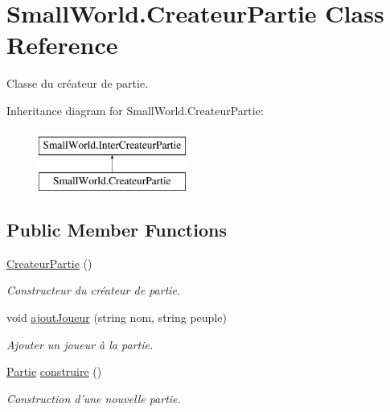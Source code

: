 \hypertarget{class_small_world_1_1_createur_partie}{\section{Small\-World.\-Createur\-Partie Class Reference}
\label{class_small_world_1_1_createur_partie}
}


Classe du créateur de partie.  


Inheritance diagram for Small\-World.\-Createur\-Partie\-:\begin{figure}[H]
\begin{center}
\leavevmode
\includegraphics[height=2.000000cm]{class_small_world_1_1_createur_partie}
\end{center}
\end{figure}
\subsection*{Public Member Functions}
\begin{DoxyCompactItemize}
\item 
\hyperlink{class_small_world_1_1_createur_partie_a6b32ea8a3b1daeb8530dd882b3791838}{Createur\-Partie} ()
\begin{DoxyCompactList}\small\item\em Constructeur du créateur de partie. \end{DoxyCompactList}\item 
void \hyperlink{class_small_world_1_1_createur_partie_a1388144440304d2d82879a15e0e58e1f}{ajout\-Joueur} (string nom, string peuple)
\begin{DoxyCompactList}\small\item\em Ajouter un joueur à la partie. \end{DoxyCompactList}\item 
\hyperlink{class_small_world_1_1_partie}{Partie} \hyperlink{class_small_world_1_1_createur_partie_a434764cadcd4b11f8b171ed8becfdc6d}{construire} ()
\begin{DoxyCompactList}\small\item\em Construction d'une nouvelle partie. \end{DoxyCompactList}\end{DoxyCompactItemize}
